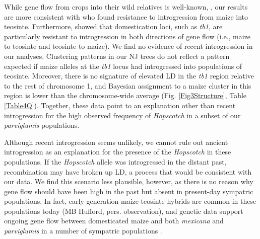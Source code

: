 \documentclass[11pt]{article}
\begin{document}
\begin{linenumbers}
\begin{flushleft}
While gene flow from crops into their wild relatives is well-known, \citep{Ellstrand1999, Zhang2009, Thurber2010, Baack2008, Hubner2012, Wilkes1977, VanHeerwaarden2011, Barrett1983}, our results are more consistent with \citet{Hufford2013} who found resistance to introgression from maize into teosinte. Furthermore, \citet{Hufford2013} showed that domestication loci, such as \emph{tb1}, are particularly resistant to introgression in both directions of gene flow (i.e., maize to teosinte and teosinte to maize). We find no evidence of recent introgression in our analyses. Clustering patterns in our NJ trees do not reflect a pattern expected if maize alleles at the \emph{tb1} locus had introgressed into populations of teosinte.  Moreover, there is no signature of elevated LD in the \emph{tb1} region relative to the rest of chromosome 1, and Bayesian assignment to a maize cluster in this region is lower than the chromosome-wide average (Fig. \ref{Fig3Structure}, Table \ref{Table4Q}). Together, these data point to an explanation other than recent introgression for the high observed frequency of \emph{Hopscotch} in a subset of our \emph{parviglumis} populations.

Although recent introgression seems unlikely, we cannot rule out ancient introgression as an explanation for the presence of the \emph{Hopscotch} in these populations. If the \emph{Hopscotch} allele was introgressed in the distant past, recombination may have broken up LD, a process that would be consistent with our data.  We find this scenario less plausible, however, as there is no reason why gene flow should have been high in the past but absent in present-day sympatric populations.  In fact, early generation maize-teosinte hybrids are common in these populations today (MB Hufford, pers. observation), and genetic data support ongoing gene flow between domesticated maize and both \emph{mexicana} and \emph{parviglumis} in a number of sympatric populations \citep{Hufford2013, Ellstrand2007, VanHeerwaarden2011}. 


\end{flushleft}
\end{linenumbers}
\end{document}
